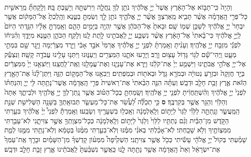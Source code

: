 \documentclass[twoside, openany, parskip=half, 11pt]{book}
\begin{document}
\begin{footnotesize}
\begin{multicols}{2}
\\
 וְהָיָה֙ כִּֽי־תָב֣וֹא אֶל־הָאָ֔רֶץ אֲשֶׁר֙ יְיָ֣ אֱלֹהֶ֔יךָ נֹתֵ֥ן לְךָ֖ נַֽחֲלָ֑ה וִֽירִשְׁתָּ֖הּ וְיָשַׁ֥בְתָּ בָּֽהּ׃ וְלָֽקַחְתָּ֞ מֵֽרֵאשִׁ֣ית כָּל־פְּרִ֣י הָֽאֲדָמָ֗ה אֲשֶׁ֨ר תָּבִ֧יא מֵֽאַרְצְךָ֛ אֲשֶׁ֨ר יְיָ֧ אֱלֹהֶ֛יךָ נֹתֵ֥ן לָ֖ךְ וְשַׂמְתָּ֣ בַטֶּ֑נֶא וְהָֽלַכְתָּ֙ אֶל־הַמָּק֔וֹם אֲשֶׁ֤ר יִבְחַר֙ יְיָ֣ אֱלֹהֶ֔יךָ לְשַׁכֵּ֥ן שְׁמ֖וֹ שָֽׁם׃ וּבָאתָ֙ אֶל־הַכֹּהֵ֔ן אֲשֶׁ֥ר יִֽהְיֶ֖ה בַּיָּמִ֣ים הָהֵ֑ם וְאָֽמַרְתָּ֣ אֵלָ֗יו הִגַּ֤דְתִּי הַיּוֹם֙ לַֽיְיָ֣ אֱלֹהֶ֔יךָ כִּי־בָ֨אתִי֙ אֶל־הָאָ֔רֶץ אֲשֶׁ֨ר נִשְׁבַּ֧ע יְיָ֛ לַֽאֲבֹתֵ֖ינוּ לָ֥תֶת לָֽנוּ׃ 
 וְלָקַ֧ח הַכֹּהֵ֛ן הַטֶּ֖נֶא מִיָּדֶ֑ךָ וְהִ֨נִּיח֔וֹ לִפְנֵ֕י מִזְבַּ֖ח יְיָ֥ אֱלֹהֶֽיךָ׃ וְעָנִ֨יתָ וְאָֽמַרְתָּ֜ לִפְנֵ֣י יְיָ֣ אֱלֹהֶ֗יךָ אֲרַמִּי֙ אֹבֵ֣ד אָבִ֔י וַיֵּ֣רֶד מִצְרַ֔יְמָה וַיָּ֥גָר שָׁ֖ם בִּמְתֵ֣י מְעָ֑ט וַֽיְהִי־שָׁ֕ם לְג֥וֹי גָּד֖וֹל עָצ֥וּם וָרָֽב׃ וַיָּרֵ֧עוּ אֹתָ֛נוּ הַמִּצְרִ֖ים וַיְעַנּ֑וּנוּ וַיִּתְּנ֥וּ עָלֵ֖ינוּ עֲבֹדָ֥ה קָשָֽׁה׃ וַנִּצְעַ֕ק אֶל־יְיָ֖ אֱלֹהֵ֣י אֲבֹתֵ֑ינוּ וַיִּשְׁמַ֤ע יְיָ֙ אֶת־קֹלֵ֔נוּ וַיַּ֧רְא אֶת־עָנְיֵ֛נוּ וְאֶת־עֲמָלֵ֖נוּ וְאֶֽת־לַֽחֲצֵֽנוּ׃ וַיּֽוֹצִאֵ֤נוּ יְיָ֙ מִמִּצְרַ֔יִם בְּיָ֤ד חֲזָקָה֙ וּבִזְרֹ֣עַ נְטוּיָ֔ה וּבְמֹרָ֖א גָּדֹ֑ל וּבְאֹת֖וֹת וּבְמֹֽפְתִֽים׃ וַיְבִאֵ֖נוּ אֶל־הַמָּק֣וֹם הַזֶּ֑ה וַיִּתֶּן־לָ֨נוּ֙ אֶת־הָאָ֣רֶץ הַזֹּ֔את אֶ֛רֶץ זָבַ֥ת חָלָ֖ב וּדְבָֽשׁ׃ וְעַתָּ֗ה הִנֵּ֤ה הֵבֵ֨אתִי֙ אֶת־רֵאשִׁית֙ פְּרִ֣י הָֽאֲדָמָ֔ה אֲשֶׁר־נָתַ֥תָּה לִּ֖י יְיָ֑ וְהִנַּחְתּ֗וֹ לִפְנֵי֙ יְיָ֣ אֱלֹהֶ֔יךָ וְהִ֨שְׁתַּֽחֲוִ֔יתָ לִפְנֵ֖י יְיָ֥ אֱלֹהֶֽיךָ׃ וְשָֽׂמַחְתָּ֣ בְכָל־הַטּ֗וֹב אֲשֶׁ֧ר נָֽתַן־לְךָ֛ יְיָ֥ אֱלֹהֶ֖יךָ וּלְבֵיתֶ֑ךָ אַתָּה֙ וְהַלֵּוִ֔י וְהַגֵּ֖ר אֲשֶׁ֥ר בְּקִרְבֶּֽךָ׃ \textbf{ס} 
 כִּ֣י תְכַלֶּ֞ה לַ֠עְשֵׂ֠ר אֶת־כָּל־מַעְשַׂ֧ר תְּבוּאָֽתְךָ֛ בַּשָּׁנָ֥ה הַשְּׁלִישִׁ֖ת שְׁנַ֣ת הַֽמַּֽעֲשֵׂ֑ר וְנָֽתַתָּ֣ה לַלֵּוִ֗י לַגֵּר֙ לַיָּת֣וֹם וְלָֽאַלְמָנָ֔ה וְאָֽכְל֥וּ בִשְׁעָרֶ֖יךָ וְשָׂבֵֽעוּ׃ וְאָֽמַרְתָּ֡ לִפְנֵי֩ יְיָ֨ אֱלֹהֶ֜יךָ בִּעַ֧רְתִּי הַקֹּ֣דֶשׁ מִן־הַבַּ֗יִת וְגַ֨ם נְתַתִּ֤יו לַלֵּוִי֙ וְלַגֵּר֙ לַיָּת֣וֹם וְלָֽאַלְמָנָ֔ה כְּכָל־מִצְוָֽתְךָ֖ אֲשֶׁ֣ר צִוִּיתָ֑נִי לֹֽא־עָבַ֥רְתִּי מִמִּצְוֹתֶ֖יךָ וְלֹ֥א שָׁכָֽחְתִּי׃ לֹֽא־אָכַ֨לְתִּי בְאֹנִ֜י מִמֶּ֗נּוּ וְלֹֽא־בִעַ֤רְתִּי מִמֶּ֨נּוּ֙ בְּטָמֵ֔א וְלֹֽא־נָתַ֥תִּי מִמֶּ֖נּוּ לְמֵ֑ת שָׁמַ֗עְתִּי בְּקוֹל֙ יְיָ֣ אֱלֹהָ֔י עָשִׂ֕יתִי כְּכֹ֖ל אֲשֶׁ֥ר צִוִּיתָֽנִי׃ הַשְׁקִ֩יפָה֩ מִמְּע֨וֹן קָדְשְׁךָ֜ מִן־הַשָּׁמַ֗יִם וּבָרֵ֤ךְ אֶֽת־עַמְּךָ֙ אֶת־יִשְׂרָאֵ֔ל וְאֵת֙ הָֽאֲדָמָ֔ה אֲשֶׁ֥ר נָתַ֖תָּה לָ֑נוּ כַּֽאֲשֶׁ֤ר נִשְׁבַּ֨עְתָּ֙ לַֽאֲבֹתֵ֔ינוּ אֶ֛רֶץ זָבַ֥ת חָלָ֖ב וּדְבָֽשׁ׃


\end{multicols}
\end{footnotesize}
\end{document}
